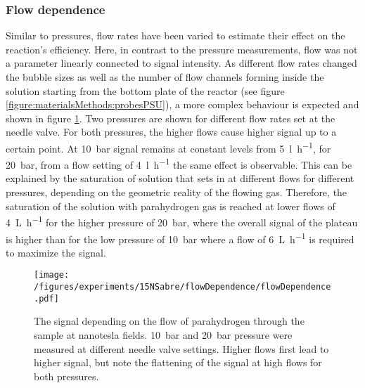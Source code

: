     \subsubsection{Flow dependence}
    Similar to pressures, flow rates have been varied to estimate their effect on the reaction's efficiency. Here, in contrast to the pressure measurements, flow was not a parameter linearly connected to signal intensity. As different flow rates changed the bubble sizes as well as the number of flow channels forming inside the solution starting from the bottom plate of the reactor (see figure \ref{figure:materialsMethods:probesPSU}), a more complex behaviour is expected and shown in figure \ref{fig:results:15N:flowDependence}. Two pressures are shown for different flow rates set at the needle valve. For both pressures, the higher flows cause higher signal up to a certain point. At \SI{10}{\bar} signal remains at constant levels from \SI{5}{\litre\per\hour}, for \SI{20}{\bar}, from a flow setting of \SI{4}{\litre\per\hour} the same effect is observable. This can be explained by the saturation of solution that sets in at different flows for different pressures, depending on the geometric reality of the flowing gas. Therefore, the saturation of the solution with parahydrogen gas is reached at lower flows  of \SI{4}{\liter\per\hour} for the higher pressure of \SI{20}{\bar}, where the overall signal of the plateau is higher than for the low pressure of \SI{10}{\bar} where a flow of \SI{6}{\liter\per\hour} is required to maximize the signal.
        \begin{figure}
            \texttt{[image: /figures/experiments/15NSabre/flowDependence/flowDependence.pdf]}
            \caption[Flow dependence]{The signal depending on the flow of parahydrogen through the sample at nanotesla fields. \SI{10}{\bar} and \SI{20}{\bar} pressure were measured at different needle valve settings. Higher flows first lead to higher signal, but note the flattening of the signal at high flows for both pressures.}
            \label{fig:results:15N:flowDependence}
        \end{figure}
